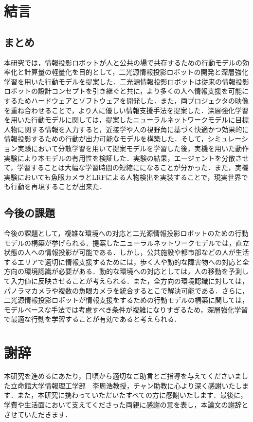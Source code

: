 \documentclass[12pt]{sonota/aislab}
\begin{document}
\chapter{結言}
\section{まとめ}
本研究では，情報投影ロボットが人と公共の場で共存するための行動モデルの効率化と計算量の軽量化を目的として，二光源情報投影ロボットの開発と深層強化学習を用いた行動モデルを提案した．二光源情報投影ロボットは従来の情報投影ロボットの設計コンセプトを引き継ぐと共に，より多くの人へ情報支援を可能にするためハードウェアとソフトウェアを開発した．また，両プロジェクタの映像を重ね合わせることで，より人に優しい情報支援手法を提案した．深層強化学習を用いた行動モデルに関しては，提案したニューラルネットワークモデルに目標人物に関する情報を入力すると，近接学や人の視野角に基づく快適かつ効果的に情報投影するための行動が出力可能なモデルを構築した．そして，シミュレーション実験において分散学習を用いて提案モデルを学習した後，実機を用いた動作実験により本モデルの有用性を検証した．実験の結果，エージェントを分散させて，学習することは大幅な学習時間の短縮にになることが分かった．また，実機実験においても魚眼カメラとLRFによる人物検出を実装することで，現実世界でも行動を再現することが出来た．

\section{今後の課題}
今後の課題として，複雑な環境への対応と二光源情報投影ロボットのための行動モデルの構築が挙げられる．提案したニューラルネットワークモデルでは，直立状態の人への情報投影が可能である．しかし，公共施設や都市部などの人が生活するエリアで適切に情報支援するためには，歩く人や動的な障害物への対応と全方向の環境認識が必要がある．動的な環境への対応としては，人の移動を予測して入力値に反映させることが考えられる．また，全方向の環境認識に対しては，パノラマカメラや複数の魚眼カメラを統合するとこで解決可能である．さらに，二光源情報投影ロボットが情報支援をするための行動モデルの構築に関しては，モデルベースな手法では考慮すべき条件が複雑になりすぎるため，深層強化学習で最適な行動を学習することが有効であると考えられる．

\chapter*{謝辞}
本研究を進めるにあたり，日頃から適切なご助言とご指導を与えてくださいました立命館大学情報理工学部　李周浩教授，チャン助教に心より深く感謝いたします．また，本研究に携わっていただいたすべての方に感謝いたします．最後に，学費や生活面において支えてくださった両親に感謝の意を表し，本論文の謝辞とさせていただきます．
\end{document}
